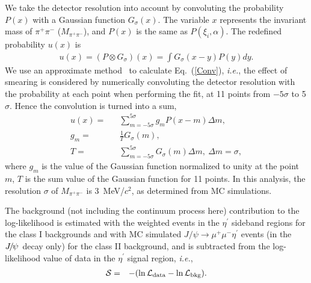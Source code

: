 \documentclass[twocolumn,showpacs,aps,prd]{revtex4-1}
\newcommand{\etap}{\eta^{\prime}}
\newcommand{\jpsidimu}{J/\psi\rightarrow\mu^{+} \mu^{-}\etap}
\begin{document}
We take the detector resolution into account by convoluting the probability $P(x)$ with a Gaussian function $G_\sigma(x)$. The
variable $x$ represents the invariant mass of $\pi^+\pi^-$ ($M_{\pi^+\pi^-}$), and $P(x)$ is the same as $ P(\xi_i, \alpha)$. The redefined probability $u(x)$
is
%
\begin{eqnarray}
  \label{Conv}
  u(x) = (P \otimes G_{\sigma})(x) = \int G_{\sigma}(x - y) P(y)dy.
\end{eqnarray}
%
We use an approximate method~\cite{res_cleoc,chdfu}
to calculate Eq.~(\ref{Conv}), \textit{i.e.}, the effect of smearing is considered by numerically convoluting the detector resolution with
the probability at each point when performing the fit, at 11 points from $-5\sigma$ to 5$\sigma$. Hence the convolution is turned
into a sum,
%
\begin{eqnarray}
  \label{Convsum}
  u(x)  = &&\sum^{5\sigma}_{m=-5\sigma}g_m P(x - m)\Delta m, \nonumber \\
  g_{m} = &&\frac{1}{T} G_\sigma(m), \\
      T = &&\sum^{5\sigma}_{m=-5\sigma}G_\sigma(m)\Delta m,~
 \Delta m = \sigma,\nonumber
\end{eqnarray}
%
where $g_m$ is the value of the Gaussian function normalized to unity at the point $m$, $T$ is the sum value of the Gaussian function for 11 points. In this analysis, the resolution $\sigma$ of $M_{\pi^{+}\pi^{-}}$ is 3~MeV/$c^{2}$, as determined from MC simulations.


The background (not including the continuum process here) contribution to the log-likelihood is estimated with the weighted events in the $\etap$ sideband regions for the class I backgrounds and with MC simulated $\jpsidimu$ events (in the ${J\mskip -3mu/\mskip -2mu\psi\mskip 2mu}$ decay only) for the class II
background, and is subtracted from the log-likelihood value of data in the $\eta^\prime$ signal region, \textit{i.e.},
%
\begin{eqnarray}
  \label{eqlikelihood}
  {\cal S} = && -(\ln{\cal L}_\text{data} - \ln{\cal L}_\text{bkg}).
\end{eqnarray}
%
\end{document}
